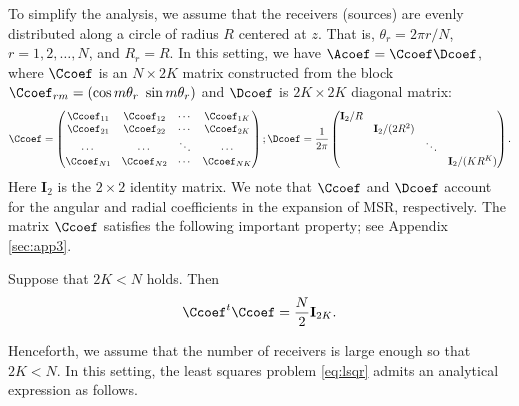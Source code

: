 To simplify the analysis, we assume that the receivers (sources)
are evenly distributed along a circle of radius $R$ centered at
$z$. That is, $\theta_r = 2\pi r/N$, $r = 1, 2, \ldots, N$, and
$R_r = R$. In this setting, we have $\Acoef = \Ccoef \Dcoef$,
where $\Ccoef$ is an $N \times 2K$ matrix constructed from the
block $\Ccoef_{rm} = (\cos m \theta_r\ \sin m\theta_r)$ and
$\Dcoef$ is $2K \times 2K$ diagonal matrix:
\begin{equation*}
\Ccoef = \begin{pmatrix}
\Ccoef_{11} & \Ccoef_{12} & \cdots & \Ccoef_{1K}\\
\Ccoef_{21} & \Ccoef_{22} & \cdots & \Ccoef_{2K}\\
\cdots & \cdots & \ddots & \cdots\\
\Ccoef_{N1} & \Ccoef_{N2} & \cdots & \Ccoef_{NK}
\end{pmatrix};
\Dcoef = \frac{1}{2\pi} \begin{pmatrix}
  \mathbf{I}_2/R&  &  &  \\
  &   \mathbf{I}_2/(2 R^2) &   &  \\
  &   & \ddots &  \\
  &   &   & \mathbf{I}_2/(K R^K)
\end{pmatrix}.
\end{equation*}
Here $\mathbf{I}_2$ is the $2\times 2$ identity matrix. We note
that $\Ccoef$ and $\Dcoef$ account for the angular and radial
coefficients in the expansion of MSR, respectively. The matrix
$\Ccoef$ satisfies the following important property; see Appendix
\ref{sec:app3}.

\begin{proposition} Suppose that $2K < N$ holds. Then
\begin{equation}
\Ccoef^t \Ccoef = \frac{N}{2} \mathbf{I}_{2K}. \label{eq:ortho}
\end{equation}
\end{proposition}

Henceforth, we assume that the number of receivers is large enough
so that $2K < N$. In this setting, the least squares problem
\eqref{eq:lsqr} admits an analytical expression as follows.

